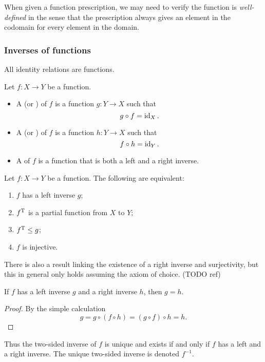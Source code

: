 When given a function prescription, we may need to verify the function is \emph{well-defined} in the sense that the prescription always gives an element in the codomain for every element in the domain.

\subsubsection{Inverses of functions}
All identity relations are functions.

\begin{definition}
Let $f:X\to Y$ be a function.
\begin{itemize}
\item A  (or ) of $f$ is a function $g: Y\to X$ such that
\[ g\circ f = \operatorname{id}_X. \]
\item A  (or ) of $f$ is a function $h: Y\to X$ such that
\[ f\circ h = \operatorname{id}_Y. \]
\item A  of $f$ is a function that is both a left and a right inverse.
\end{itemize}
\end{definition}

\begin{lemma}
Let $f:X\to Y$ be a function. The following are equivalent:
\begin{enumerate}
\item $f$ has a left inverse $g$;
\item $f^{\mathrm{T}}$ is a partial function from $X$ to $Y$; 
\item $f^{\mathrm{T}} \leq g$;
\item $f$ is injective.
\end{enumerate}
\end{lemma}
There is also a result linking the existence of a right inverse and surjectivity, but this in general only holds assuming the axiom of choice. (TODO ref)

\begin{lemma} \label{lemma:leftRightInverse}
If $f$ has a left inverse $g$ and a right inverse $h$, then $g=h$.
\end{lemma}
\begin{proof}
By the simple calculation
\[ g = g\circ (f\circ h) = (g\circ f) \circ h = h. \]
\end{proof}
Thus the two-sided inverse of $f$ is unique and exists \textup{if and only if} $f$ has a left and a right inverse. The unique two-sided inverse is denoted $f^{-1}$.

